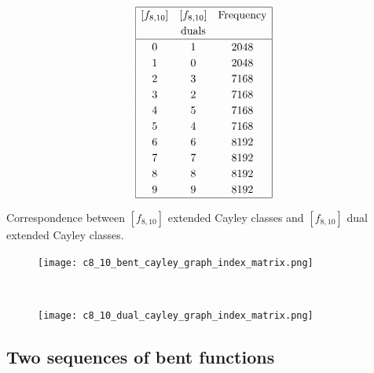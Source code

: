 \documentclass[12pt,a4paper]{article}
\begin{document}
\begin{table}
\small{}
\begin{align*}
\def\arraystretch{1.2}
\begin{array}{|ccc|}
\hline
[f_{8,10}] &
[f_{8,10}] &
\text{Frequency}
\\
&
\text{duals} &
\\
\hline
  0 &    1 & 2048
\\
  1 &    0 & 2048
\\
  2 &    3 & 7168
\\
  3 &    2 & 7168
\\
  4 &    5 & 7168
\\
  5 &    4 & 7168
\\
  6 &    6 & 8192
\\
  7 &    7 & 8192
\\
  8 &    8 & 8192
\\
  9 &    9 & 8192
\\
\hline
\end{array}
\end{align*}
\caption{Correspondence between $[f_{8,10}]$ extended Cayley classes and $[f_{8,10}]$ dual extended Cayley classes.}
\label{tab-c8_10-dual-EC_classes}
\end{table}

\begin{figure}[!bhpt] %
\centering
\begin{minipage}{.48\textwidth}
  \centering
  \texttt{[image: c8\_10\_bent\_cayley\_graph\_index\_matrix.png]}
  \label{fig:c8_10_bent_cayley_graph_index_matrix}
\end{minipage}
~~
\begin{minipage}{.48\textwidth}
  \centering
  \texttt{[image: c8\_10\_dual\_cayley\_graph\_index\_matrix.png]}
  \label{fig:c8_10_dual_cayley_graph_index_matrix}
\end{minipage}%
\end{figure}
\newpage

\subsection{Two sequences of bent functions}
\end{document}
